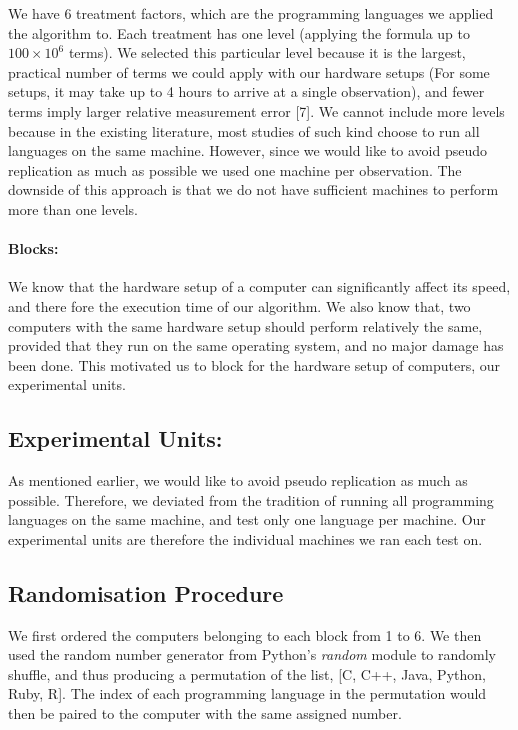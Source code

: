 \documentclass[12pt,halfline,a4paper,]{ouparticle}
\begin{document}
We have 6 treatment factors, which are the programming languages we
applied the algorithm to. Each treatment has one level (applying the
formula up to \(100 \times 10^6\) terms). We selected this particular
level because it is the largest, practical number of terms we could
apply with our hardware setups (For some setups, it may take up to 4
hours to arrive at a single observation), and fewer terms imply larger
relative measurement error {[}7{]}. We cannot include more levels
because in the existing literature, most studies of such kind choose to
run all languages on the same machine. However, since we would like to
avoid pseudo replication as much as possible we used one machine per
observation. The downside of this approach is that we do not have
sufficient machines to perform more than one levels.

\paragraph{Blocks:}\label{blocks}

We know that the hardware setup of a computer can significantly affect
its speed, and there fore the execution time of our algorithm. We also
know that, two computers with the same hardware setup should perform
relatively the same, provided that they run on the same operating
system, and no major damage has been done. This motivated us to block
for the hardware setup of computers, our experimental units.

\subsection{Experimental Units:}\label{experimental-units}

As mentioned earlier, we would like to avoid pseudo replication as much
as possible. Therefore, we deviated from the tradition of running all
programming languages on the same machine, and test only one language
per machine. Our experimental units are therefore the individual
machines we ran each test on.

\subsection{Randomisation Procedure}\label{randomisation-procedure}

We first ordered the computers belonging to each block from 1 to 6. We
then used the random number generator from Python's \emph{random} module
to randomly shuffle, and thus producing a permutation of the list, {[}C,
C++, Java, Python, Ruby, R{]}. The index of each programming language in
the permutation would then be paired to the computer with the same
assigned number.
\end{document}
